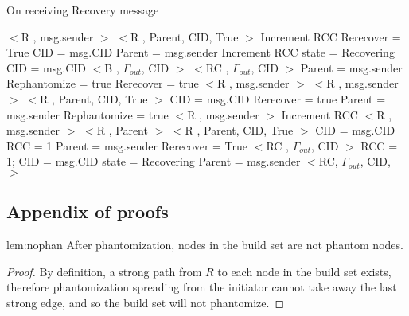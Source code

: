 \begin{algorithm}[H]
\caption{On receiving Recovery message}
\label{Recovery message received}
\scriptsize
\begin{multicols}{2}
\begin{algorithmic}[1]
	\State $<$R , msg.sender $>$
		\State $<$R , Parent, CID, True $>$
	\EndIf
	\State Increment RCC 
	\State Rerecover = True
	\State CID = msg.CID
	\State Parent = msg.sender
	\State Increment RCC
	\State state = Recovering
	\State CID = msg.CID
	\State $<$B , $\Gamma_{out}$, CID $>$
  \Else
	\State $<$RC , $\Gamma_{out}$, CID $>$
  \EndIf
	\State Parent = msg.sender
		\State Rephantomize = true
		\State Rerecover = true
		\State $<$R , msg.sender $>$
		\State $<$R , msg.sender $>$
	\Else
			\State $<$R , Parent, CID, True $>$
		\EndIf
		\State CID = msg.CID
		\State Rerecover = true
		\State Parent = msg.sender
		\State Rephantomize = true
	\EndIf
{}
		\State $<$R , msg.sender $>$
		\State Increment RCC
		\State $<$R , msg.sender $>$
			\State $<$R , Parent $>$
		\EndIf
	\Else
			\State $<$R , Parent, CID, True $>$
		\EndIf
		\State CID = msg.CID
		\State RCC = 1
		\State Parent = msg.sender
			\State Rerecover = True	
		\Else 
			\State $<$RC , $\Gamma_{out}$, CID $>$
		\EndIf
	\EndIf
{}
	\State RCC = 1;
	\State CID = msg.CID
	\State state = Recovering
	\State Parent = msg.sender
	\State $<$RC,  $\Gamma_{out}$, CID, $>$
\EndIf
\EndProcedure
\end{algorithmic}
\end{multicols}
\end{algorithm}	

\subsection{Appendix of proofs}
\label{proofapp}
\begin{replemma}{lem:nophan}
After phantomization, nodes in the build set are not phantom nodes.
\end{replemma}
\begin{proof}
By definition, a strong path from $R$ to each node in the build set
exists, therefore phantomization spreading from the initiator cannot take
away the last strong edge, and so the build set will not phantomize.
\end{proof}

